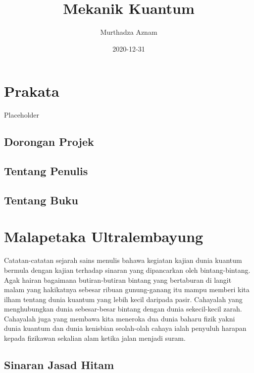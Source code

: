 \documentclass[
]{book}
\title{Mekanik Kuantum}
\author{Murthadza Aznam}
\date{2020-12-31}
\begin{document}
\frontmatter
\maketitle

\mainmatter
\hypertarget{prakata}{%
\chapter*{Prakata}\label{prakata}}

Placeholder

\hypertarget{dorongan-projek}{%
\section*{Dorongan Projek}\label{dorongan-projek}}

\hypertarget{tentang-penulis}{%
\section*{Tentang Penulis}\label{tentang-penulis}}

\hypertarget{tentang-buku}{%
\section*{Tentang Buku}\label{tentang-buku}}

\hypertarget{malapetaka-ultralembayung}{%
\chapter{Malapetaka Ultralembayung}\label{malapetaka-ultralembayung}}

Catatan-catatan sejarah sains menulis bahawa kegiatan kajian dunia
kuantum bermula dengan kajian terhadap sinaran yang dipancarkan oleh
bintang-bintang. Agak hairan bagaimana butiran-butiran bintang yang
bertaburan di langit malam yang hakikatnya sebesar ribuan gunung-ganang
itu mampu memberi kita ilham tentang dunia kuantum yang lebih kecil
daripada pasir. Cahayalah yang menghubungkan dunia sebesar-besar bintang
dengan dunia sekecil-kecil zarah. Cahayalah juga yang membawa kita
meneroka dua dunia baharu fizik yakni dunia kuantum dan dunia kenisbian
seolah-olah cahaya ialah penyuluh harapan kepada fizikawan sekalian alam
ketika jalan menjadi suram.

\hypertarget{sinaran-jasad-hitam}{%
\section{Sinaran Jasad Hitam}\label{sinaran-jasad-hitam}}
\end{document}
